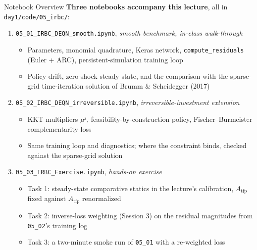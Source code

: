 \documentclass[aspectratio=169,11pt]{beamer}
\begin{document}
\begin{frame}{Notebook Overview}
\scriptsize
\textbf{Three notebooks accompany this lecture}, all in \texttt{day1/code/05\_irbc/}:

\vspace{0.2em}
\begin{enumerate}\itemsep1pt
    \item \texttt{05\_01\_IRBC\_DEQN\_smooth.ipynb}, \emph{smooth benchmark, in-class walk-through}
    \begin{itemize}\itemsep0pt
        \item Parameters, monomial quadrature, Keras network, \texttt{compute\_residuals} (Euler + ARC), persistent-simulation training loop
        \item Policy drift, zero-shock steady state, and the comparison with the sparse-grid time-iteration solution of Brumm \& Scheidegger (2017)
    \end{itemize}

    \item \texttt{05\_02\_IRBC\_DEQN\_irreversible.ipynb}, \emph{irreversible-investment extension}
    \begin{itemize}\itemsep0pt
        \item KKT multipliers $\mu^j$, feasibility-by-construction policy, Fischer--Burmeister complementarity loss
        \item Same training loop and diagnostics; where the constraint binds, checked against the sparse-grid solution
    \end{itemize}

    \item \texttt{05\_03\_IRBC\_Exercise.ipynb}, \emph{hands-on exercise}
    \begin{itemize}\itemsep0pt
        \item Task 1: steady-state comparative statics in the lecture's calibration, $A_{\text{tfp}}$ fixed against $A_{\text{tfp}}$ renormalized
        \item Task 2: inverse-loss weighting (Session 3) on the residual magnitudes from \texttt{05\_02}'s training log
        \item Task 3: a two-minute smoke run of \texttt{05\_01} with a re-weighted loss
    \end{itemize}
\end{enumerate}
\end{frame}
\end{document}

